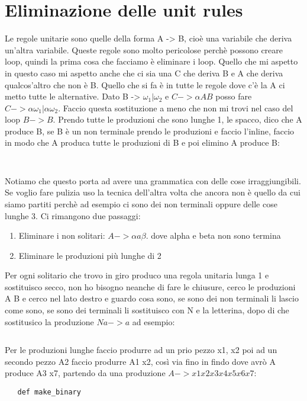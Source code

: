 \section{Eliminazione delle unit rules}
Le regole unitarie sono quelle della forma A -> B, cioè una variabile che deriva un'altra variabile. Queste regole sono molto pericolose perchè possono creare loop, quindi la prima cosa che facciamo è eliminare i loop. Quello che mi aspetto in questo caso mi aspetto anche che ci sia una C che deriva B e A che deriva qualcos'altro che non è B. Quello che si fa è in tutte le regole dove c'è la A ci metto tutte le alternative. Dato B -> $\omega_1 | \omega_2$ e $C -> \alpha A B$ posso fare $C -> \alpha \omega_1 | \alpha \omega_2$. Faccio questa sostituzione a meno che non mi trovi nel caso del loop $B -> B$.
Prendo tutte le produzioni che sono lunghe 1, le spacco, dico che A produce B, se B è un non terminale prendo le produzioni e faccio l'inline, faccio in modo che A produca tutte le produzioni di B e poi elimino A produce B:
\begin{lstlisting}
  
\end{lstlisting}

Notiamo che questo porta ad avere una grammatica con delle cose irraggiungibili. Se voglio fare pulizia uso la tecnica dell'altra volta che ancora non è quello da cui siamo partiti perchè ad esempio ci sono dei non terminali oppure delle cose lunghe 3.
Ci rimangono due passaggi:
\begin{enumerate}
    \item Eliminare i non solitari: $A -> \alpha a \beta$. dove alpha e beta non sono termina
    \item Eliminare le produzioni più lunghe di 2
\end{enumerate}

Per ogni solitario che trovo in giro produco una regola unitaria lunga 1 e sostituisco secco, non ho bisogno neanche di fare le chiusure, cerco le produzioni A B e cerco nel lato destro e guardo cosa sono, se sono dei non terminali li lascio come sono, se sono dei terminali li sostituisco con N e la letterina, dopo di che sostitusico la produzione $Na -> a$ ad esempio:
\begin{lstlisting}
\end{lstlisting}

Per le produzioni lunghe faccio produrre ad un prio pezzo x1, x2 poi ad un secondo pezzo A2 faccio produrre A1 x2, così via fino in findo dove avrò A produce A3 x7, partendo da una produzione $A -> x1 x2 x3 x4 x5 x6 x7$:
\begin{lstlisting}
   def make_binary 
\end{lstlisting}

